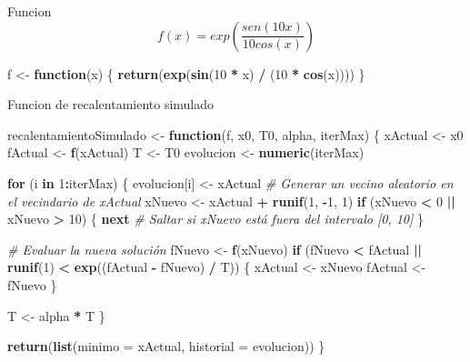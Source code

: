 \documentclass[
]{article}
\newenvironment{Shaded}{\begin{snugshade}}{\end{snugshade}}
\newcommand{\AttributeTok}[1]{\textcolor[rgb]{0.13,0.29,0.53}{#1}}
\newcommand{\CommentTok}[1]{\textcolor[rgb]{0.56,0.35,0.01}{\textit{#1}}}
\newcommand{\ControlFlowTok}[1]{\textcolor[rgb]{0.13,0.29,0.53}{\textbf{#1}}}
\newcommand{\DecValTok}[1]{\textcolor[rgb]{0.00,0.00,0.81}{#1}}
\newcommand{\FunctionTok}[1]{\textcolor[rgb]{0.13,0.29,0.53}{\textbf{#1}}}
\newcommand{\NormalTok}[1]{#1}
\newcommand{\OtherTok}[1]{\textcolor[rgb]{0.56,0.35,0.01}{#1}}
\newcommand{\SpecialCharTok}[1]{\textcolor[rgb]{0.81,0.36,0.00}{\textbf{#1}}}
\begin{document}
Funcion \[
f(x) = exp(\frac{sen(10x)}{10cos(x)})
\]

\begin{Shaded}
\begin{Highlighting}[]
\NormalTok{f }\OtherTok{\textless{}{-}} \ControlFlowTok{function}\NormalTok{(x) \{}
  \FunctionTok{return}\NormalTok{(}\FunctionTok{exp}\NormalTok{(}\FunctionTok{sin}\NormalTok{(}\DecValTok{10} \SpecialCharTok{*}\NormalTok{ x) }\SpecialCharTok{/}\NormalTok{ (}\DecValTok{10} \SpecialCharTok{*} \FunctionTok{cos}\NormalTok{(x))))}
\NormalTok{\}}
\end{Highlighting}
\end{Shaded}

Funcion de recalentamiento simulado

\begin{Shaded}
\begin{Highlighting}[]
\NormalTok{recalentamientoSimulado }\OtherTok{\textless{}{-}} \ControlFlowTok{function}\NormalTok{(f, x0, T0, alpha, iterMax) \{}
\NormalTok{  xActual }\OtherTok{\textless{}{-}}\NormalTok{ x0}
\NormalTok{  fActual }\OtherTok{\textless{}{-}} \FunctionTok{f}\NormalTok{(xActual)}
\NormalTok{  T }\OtherTok{\textless{}{-}}\NormalTok{ T0}
\NormalTok{  evolucion }\OtherTok{\textless{}{-}} \FunctionTok{numeric}\NormalTok{(iterMax)}
  
  \ControlFlowTok{for}\NormalTok{ (i }\ControlFlowTok{in} \DecValTok{1}\SpecialCharTok{:}\NormalTok{iterMax) \{}
\NormalTok{    evolucion[i] }\OtherTok{\textless{}{-}}\NormalTok{ xActual}
    \CommentTok{\# Generar un vecino aleatorio en el vecindario de xActual}
\NormalTok{    xNuevo }\OtherTok{\textless{}{-}}\NormalTok{ xActual }\SpecialCharTok{+} \FunctionTok{runif}\NormalTok{(}\DecValTok{1}\NormalTok{, }\SpecialCharTok{{-}}\DecValTok{1}\NormalTok{, }\DecValTok{1}\NormalTok{)}
    \ControlFlowTok{if}\NormalTok{ (xNuevo }\SpecialCharTok{\textless{}} \DecValTok{0} \SpecialCharTok{||}\NormalTok{ xNuevo }\SpecialCharTok{\textgreater{}} \DecValTok{10}\NormalTok{) \{}
      \ControlFlowTok{next}  \CommentTok{\# Saltar si xNuevo está fuera del intervalo [0, 10]}
\NormalTok{    \}}
    
    \CommentTok{\# Evaluar la nueva solución}
\NormalTok{    fNuevo }\OtherTok{\textless{}{-}} \FunctionTok{f}\NormalTok{(xNuevo)}
    \ControlFlowTok{if}\NormalTok{ (fNuevo }\SpecialCharTok{\textless{}}\NormalTok{ fActual }\SpecialCharTok{||} \FunctionTok{runif}\NormalTok{(}\DecValTok{1}\NormalTok{) }\SpecialCharTok{\textless{}} \FunctionTok{exp}\NormalTok{((fActual }\SpecialCharTok{{-}}\NormalTok{ fNuevo) }\SpecialCharTok{/}\NormalTok{ T)) \{}
\NormalTok{      xActual }\OtherTok{\textless{}{-}}\NormalTok{ xNuevo}
\NormalTok{      fActual }\OtherTok{\textless{}{-}}\NormalTok{ fNuevo}
\NormalTok{    \}}
    
\NormalTok{    T }\OtherTok{\textless{}{-}}\NormalTok{ alpha }\SpecialCharTok{*}\NormalTok{ T}
\NormalTok{  \}}
  
  \FunctionTok{return}\NormalTok{(}\FunctionTok{list}\NormalTok{(}\AttributeTok{minimo =}\NormalTok{ xActual, }\AttributeTok{historial =}\NormalTok{ evolucion))}
\NormalTok{\}}
\end{Highlighting}
\end{Shaded}
\end{document}
